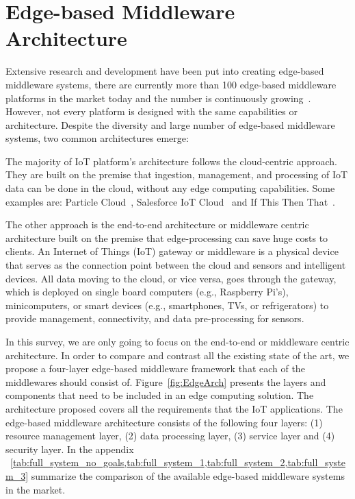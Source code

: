 \section{Edge-based Middleware Architecture}\label{sec:arch}

Extensive research and development have been put into creating edge-based middleware systems, there are currently more than 100 edge-based middleware platforms in the market today and the number is continuously growing~\cite{List}. However, not every platform is designed with the same capabilities or architecture. Despite the diversity and large number of edge-based middleware systems, two common architectures emerge:

The majority of IoT platform's architecture follows the cloud-centric approach. They are built on the premise that ingestion, management, and processing of IoT data can be done in the cloud, without any edge computing capabilities. Some examples are: Particle Cloud~\cite{Particle}, Salesforce IoT Cloud~\cite{Salesforce_IoT_Cloud} and If This Then That~\cite{IFTTT}.

The other approach is the end-to-end architecture or middleware centric architecture built on the premise that edge-processing can save huge costs to clients. An Internet of Things (IoT) gateway or middleware is a physical device that serves as the connection point between the cloud and sensors and intelligent devices. All data moving to the cloud, or vice versa, goes through the gateway, which is deployed on single board computers (e.g., Raspberry Pi's), minicomputers, or smart devices (e.g., smartphones, TVs, or refrigerators) to provide management, connectivity, and data pre-processing for sensors.

In this survey, we are only going to focus on the end-to-end or middleware centric architecture. In order to compare and contrast all the existing state of the art, we propose a four-layer edge-based middleware framework that each of the middlewares should consist of. Figure~\ref{fig:EdgeArch} presents the layers and components that need to be included in an edge computing solution. The architecture proposed covers all the requirements that the IoT applications. The edge-based middleware architecture consists of the following four layers: (1) resource management layer, (2) data processing layer, (3) service layer and (4) security layer. In the appendix ~\cref{tab:full_system_no_goals,tab:full_system_1,tab:full_system_2,tab:full_system_3} summarize the comparison of the available edge-based middleware systems in the market. 

